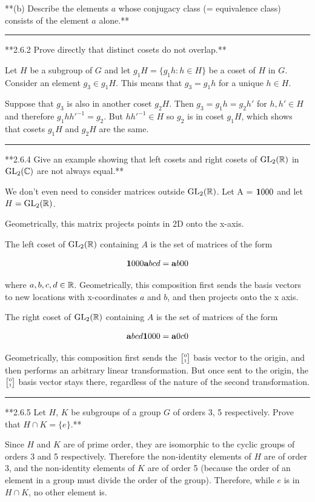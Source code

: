**(b) Describe the elements $a$ whose conjugacy class (= equivalence class)
consists of the element $a$ alone.**

\hrule

**2.6.2 Prove directly that distinct cosets do not overlap.**

Let $H$ be a subgroup of $G$ and let $g_1H = \{g_1h:h\in H\}$ be a coset of $H$
in $G$. Consider an element $g_3 \in g_1H$. This means that $g_3 = g_1h$ for a
unique $h \in H$.

Suppose that $g_3$ is also in another coset $g_2H$. Then $g_3 = g_1h = g_2h'$
for $h, h' \in H$ and therefore $g_1hh'^{-1} = g_2$. But $hh'^{-1} \in H$ so
$g_2$ is in coset $g_1H$, which shows that cosets $g_1H$ and $g_2H$ are the
same.

\hrule

**2.6.4 Give an example showing that left cosets and right cosets of $\mathrm{GL}_2(\mathbb{R})$
  in $\mathrm{GL}_2(\mathbb{C})$ are not always equal.**

We don't even need to consider matrices outside $\mathrm{GL}_2(\mathbb{R})$. Let A =
$\tiny{\mathbf{1}{0}{0}{0}}$ and let $H = \mathrm{GL}_2(\mathbb{R})$.

Geometrically, this matrix projects points in 2D onto the x-axis.

The left coset of $\mathrm{GL}_2(\mathbb{R})$ containing $A$ is the set of matrices of the form

$$
\tiny{\mathbf{1}{0}{0}{0}} \tiny{\mathbf{a}{b}{c}{d}} = \tiny{\mathbf{a}{b}{0}{0}}
$$

where $a,b,c,d \in \mathbb{R}$. Geometrically, this composition first sends the basis
vectors to new locations with x-coordinates $a$ and $b$, and then projects onto
the x axis.

The right coset of $\mathrm{GL}_2(\mathbb{R})$ containing $A$ is the set of matrices of the form

$$
\tiny{\mathbf{a}{b}{c}{d}} \tiny{\mathbf{1}{0}{0}{0}} = \tiny{\mathbf{a}{0}{c}{0}}
$$

Geometrically, this composition first sends the $\tiny{\begin{bmatrix}0\\1\end{bmatrix}}$ basis vector to
the origin, and then performs an arbitrary linear transformation. But once sent
to the origin, the $\tiny{\begin{bmatrix}0\\1\end{bmatrix}}$ basis vector stays there, regardless of the
nature of the second transformation.

\hrule

**2.6.5 Let $H$, $K$ be subgroups of a group $G$ of orders 3, 5
  respectively. Prove that $H \cap K = \{e\}$.**

Since $H$ and $K$ are of prime order, they are isomorphic to the cyclic groups
of orders 3 and 5 respectively. Therefore the non-identity elements of $H$ are
of order 3, and the non-identity elements of $K$ are of order 5 (because the
order of an element in a group must divide the order of the group). Therefore,
while $e$ is in $H \cap K$, no other element is.

